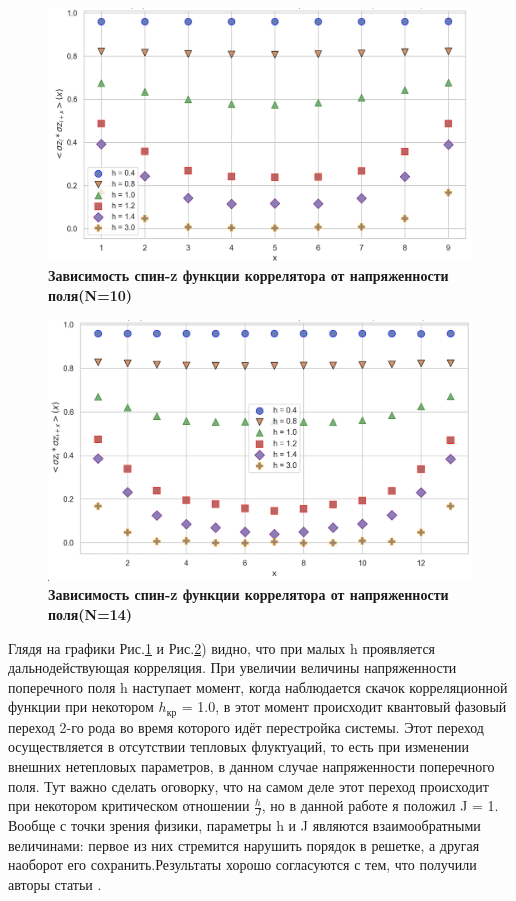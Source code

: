 \begin{figure}[H]
    \centering
    \includegraphics[width=0.8\linewidth]{Course_work/Images/Corr-N-10.png}
    \caption{\textbf{Зависимость спин-z функции коррелятора  от напряженности поля(N=10)}}
    \label{fig:e6}
\end{figure}

\begin{figure}[H]
    \centering
    \includegraphics[width=0.8\linewidth]{Course_work/Images/Corr-N-14.png}
    \caption{\textbf{Зависимость спин-z функции коррелятора  от напряженности поля(N=14)}}
    \label{fig:e7}
\end{figure}
Глядя на графики Рис.\ref{fig:e6} и Рис.\ref{fig:e7}) видно, что при малых h проявляется дальнодействующая корреляция.
При увеличии величины напряженности поперечного поля h наступает момент, когда наблюдается скачок корреляционной функции при некотором 
\(h_{\text{кр}} \) = 1.0, в этот момент происходит квантовый фазовый переход 2-го рода во время которого идёт перестройка системы. Этот переход осуществляется в отсутствии тепловых флуктуаций, то есть при изменении внешних нетепловых параметров, в данном случае напряженности поперечного поля. Тут важно сделать оговорку, что на самом деле этот переход происходит при некотором критическом отношении \( \frac{h}{J} \), но в данной работе я положил J = 1. Вообще с точки зрения физики, параметры h и J являются взаимообратными величинами: первое из них стремится нарушить порядок в решетке, а другая наоборот его сохранить.Результаты хорошо согласуются с тем, что получили авторы статьи \cite{shi2021}. 

